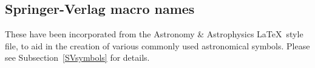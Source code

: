 \subsection{Springer-Verlag macro names}

These have been incorporated from the Astronomy \& Astrophysics \LaTeX\ 
style file, to aid in the creation of various commonly used
astronomical symbols. Please see Subsection~\ref{SVsymbols} for details.


\bsp %

\label{lastpage}


